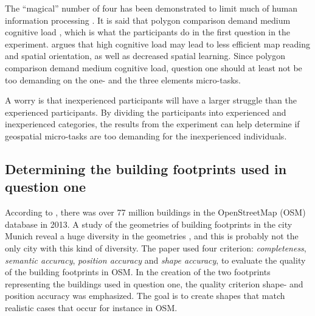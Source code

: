 The “magical” number of four has been demonstrated to limit much of human information processing \citep{Mandler2013}. It is said that polygon comparison demand medium cognitive load \citep{Kiefer2016}, which is what the participants do in the first question in the experiment. \cite{Kiefer2016} argues that high cognitive load may lead to less efficient map reading and spatial orientation, as well as decreased spatial learning. Since polygon comparison demand medium cognitive load, question one should at least not be too demanding on the one- and the three elements micro-tasks. 

A worry is that inexperienced participants will have a larger struggle than the experienced participants.  By dividing the participants into experienced and inexperienced categories, the results from the experiment can help determine if geospatial micro-tasks are too demanding for the inexperienced individuals. 

\subsection[Building shapes]{Determining the building footprints used in question one}


According to \cite{Fan2014}, there was over 77 million buildings in the OpenStreetMap (OSM) database in 2013. A study of the geometries of building footprints in the city Munich reveal a huge diversity in the geometries \citep{Fan2014}, and this is probably not the only city with this kind of diversity. The \cite{Fan2014} paper used four criterion: \textit{completeness}, \textit{semantic accuracy}, \textit{position accuracy} and \textit{shape accuracy}, to evaluate the quality of the building footprints in OSM. In the creation of the two footprints representing the buildings used in question one, the quality criterion shape- and position accuracy was emphasized. The goal is to create shapes that match realistic cases that occur for instance in OSM. 

